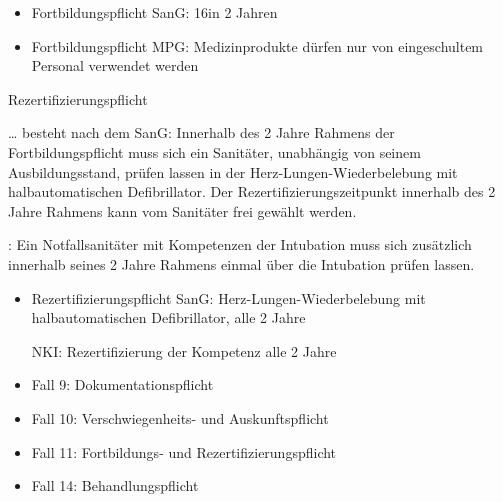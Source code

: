 {\begin{itemize}
  \item Fortbildungspflicht SanG: 16\Hour* in 2 Jahren
  \item Fortbildungspflicht MPG: Medizinprodukte dürfen nur
  von eingeschultem Personal verwendet werden
\end{itemize}
}
{}
{}
{}

{Rezertifizierungspflicht}
{\label{topic:rezertifizierungspflicht}%
{\ldots} besteht nach dem SanG: 
Innerhalb des 2 Jahre Rahmens der Fortbildungspflicht muss
sich ein Sanitäter, unabhängig von seinem Ausbildungsstand,
prüfen lassen in der Herz-Lungen-Wiederbelebung mit
halbautomatischen Defibrillator.
Der Rezertifizierungszeitpunkt innerhalb des 2 Jahre Rahmens
kann vom Sanitäter frei gewählt werden.

\noindent{}: Ein Notfallsanitäter mit
Kompetenzen der Intubation muss sich zusätzlich innerhalb seines 2
Jahre Rahmens einmal über die Intubation prüfen lassen.
}
{
\begin{itemize}
  \item Rezertifizierungspflicht SanG:
  Herz-Lungen-Wiederbelebung mit halbautomatischen
  Defibrillator, alle 2 Jahre
  
  NKI: Rezertifizierung der Kompetenz alle 2 Jahre
\end{itemize}
}
{}
{}
{}


{
\begin{itemize}
  \item Fall 9: Dokumentationspflicht
  \dotfill{}
  \item Fall 10: Verschwiegenheits- und Auskunftspflicht
  \dotfill{}
  \item Fall 11: Fortbildungs- und Rezertifizierungspflicht
  \dotfill{}
  \item Fall 14: Behandlungspflicht
  \dotfill{}
\end{itemize}
}
{}
{}
{}
{}





